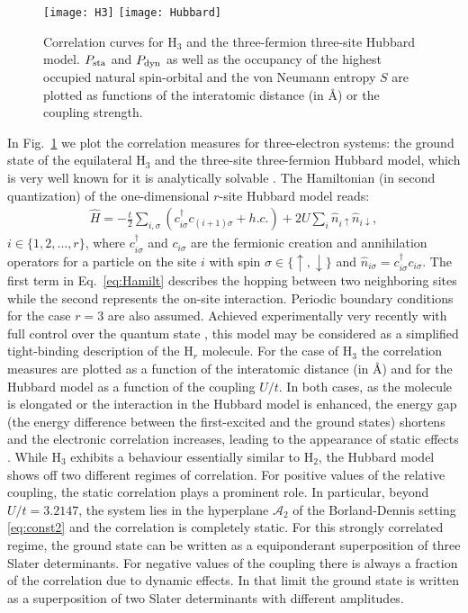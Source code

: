 \documentclass[aps,twocolumn,showpacs,pra,superscriptaddress,floatfix,longbibliography]{revtex4-1}
\newcommand{\7}{\dagger}
\begin{document}
 \begin{figure}[!t] 
\centering
        {\texttt{[image: H3]}}
        {\texttt{[image: Hubbard]}}
\caption{Correlation curves for H$_3$ and the 
three-fermion three-site Hubbard model. 
 $P_{\rm sta}$ and $P_{\rm dyn}$ as
  well as the occupancy of the highest occupied natural 
  spin-orbital and the von Neumann entropy $S$ are 
  plotted as functions of  the interatomic distance (in \AA)
  or the coupling strength.}
 \label{graf:H3}
 \end{figure}
 
 In Fig.~\ref{graf:H3} we plot the correlation measures
 for three-electron systems: the ground state of the
 equilateral H$_3$ and the three-site three-fermion Hubbard 
 model, which is very well known for it is analytically solvable \cite{newpaper, CS2015Hubbard}.  The Hamiltonian (in second quantization) of the one-dimensional $r$-site Hubbard model 
 reads:
\begin{align}
  \label{eq:Hamilt}
\hat H = -\frac{t}2 \sum_{i,\sigma}
(c^\dagger_{i\sigma} c_{(i+1)\sigma}
+ h.c. )
+ 2 U \sum_{i} \hat n_{i\uparrow} \hat n_{i \downarrow},
\end{align}
$i \in \{1,2,\dots,r\}$,
where $c^\dagger_{i\sigma}$ and $c_{i\sigma}$ are the fermionic
creation and annihilation operators for a particle on the site $i$
with spin $\sigma \in \{\uparrow, \downarrow \}$ and $\hat n_{i\sigma}
= c^\dagger_{i\sigma} c_{i\sigma}$.
The first term in Eq.~\eqref{eq:Hamilt} describes the hopping between
two neighboring sites while the second represents the on-site interaction.
Periodic boundary conditions for the case $r = 3$ are also assumed.
Achieved experimentally very recently with full control over the quantum state
\cite{PhysRevLett114}, this model may be considered as a simplified tight-binding description of the H$_r$ molecule.
 For the case of H$_3$ the correlation measures are 
 plotted as a function of the interatomic distance (in  \AA) and 
 for the Hubbard model as a function of the coupling $U/t$.  
 In both cases, as the molecule is elongated or the interaction 
 in the Hubbard model is enhanced, the energy gap 
 (the energy difference between the first-excited and the ground
 states) shortens and the electronic correlation increases, leading 
 to the appearance of static effects \cite{newpaper}.
 While H$_3$ exhibits a behaviour essentially similar to H$_2$, 
 the Hubbard model shows off two different 
 regimes of correlation. For positive values of the relative 
 coupling, the static correlation plays a prominent role. In
 particular, beyond $U/t = 3.2147$, the system lies in the 
 hyperplane $\mathcal{A}_2$ of the Borland-Dennis setting
\eqref{eq:const2} and the correlation is 
 completely static. For this strongly correlated regime, 
 the ground state can be written as a equiponderant
 superposition of three Slater determinants. For negative 
 values of the coupling there is always a fraction of the 
 correlation due to dynamic effects. In that limit the ground state
 is written as a superposition of two Slater determinants with different 
 amplitudes.
 
\end{document}
